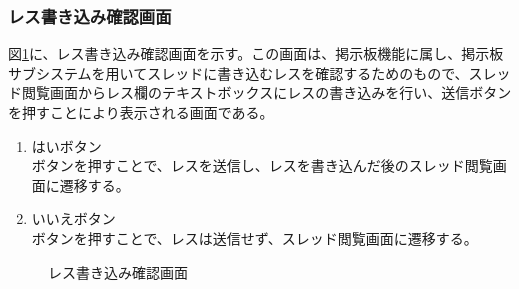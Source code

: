 \documentclass[a4j]{jarticle}
\begin{document}
\subsubsection{レス書き込み確認画面}
図\ref{fig:check_res}に、レス書き込み確認画面を示す。この画面は、掲示板機能に属し、掲示板サブシステムを用いてスレッドに書き込むレスを確認するためのもので、スレッド閲覧画面からレス欄のテキストボックスにレスの書き込みを行い、送信ボタンを押すことにより表示される画面である。

\begin{enumerate}
  \renewcommand{\labelenumi}{\textcircled{\scriptsize \theenumi}}
\item はいボタン\\
  ボタンを押すことで、レスを送信し、レスを書き込んだ後のスレッド閲覧画面に遷移する。

\item いいえボタン\\
  ボタンを押すことで、レスは送信せず、スレッド閲覧画面に遷移する。
\end{enumerate}

\begin{figure}[H]
\centering
{}
\caption{レス書き込み確認画面}
\label{fig:check_res}
\end{figure}
\end{document}
